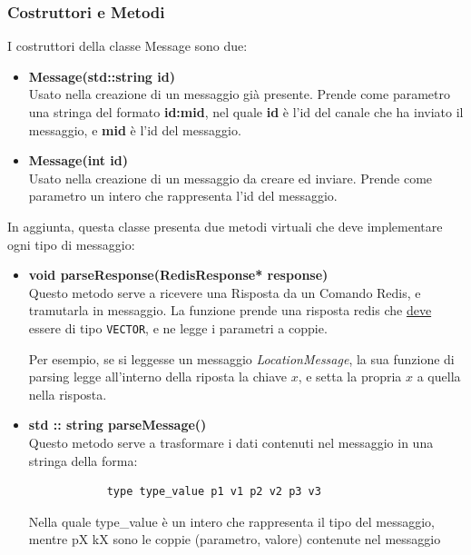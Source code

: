 \documentclass[a4paper, 11pt]{article}
\begin{document}
\subsubsection{Costruttori e Metodi}
I costruttori della classe Message sono due:
\begin{itemize}
    
    \item \textbf{Message(std::string id)}\\
        Usato nella creazione di un messaggio già presente.
        Prende come parametro una stringa del formato \textbf{id:mid}, nel quale \textbf{id} è l'id del canale che ha inviato il messaggio, e \textbf{mid} è l'id del messaggio.

    \item \textbf{Message(int id)}\\
        Usato nella creazione di un messaggio da creare ed inviare.
        Prende come parametro un intero che rappresenta l'id del messaggio.

\end{itemize}
In aggiunta, questa classe presenta due metodi virtuali che deve implementare ogni tipo di messaggio:
\begin{itemize}
    \item \textbf{void parseResponse(RedisResponse* response)}\\
        Questo metodo serve a ricevere una Risposta da un Comando Redis, e tramutarla in messaggio. 
        La funzione prende una risposta redis che \underline{deve} essere di tipo \verb|VECTOR|, e ne legge i parametri a coppie. 
        
        Per esempio, se si leggesse un messaggio\textit{ LocationMessage}, la sua funzione di parsing legge all'interno della riposta 
        la chiave $x$, e setta la propria $x$ a quella nella risposta.
    \item\textbf{std :: string parseMessage()}\\
        Questo metodo serve a trasformare i dati contenuti nel messaggio in una stringa della forma:
        \begin{verbatim}
            type type_value p1 v1 p2 v2 p3 v3
        \end{verbatim}
        Nella quale type\_value è un intero che rappresenta il tipo del messaggio, mentre pX kX sono le coppie (parametro, valore) contenute nel messaggio

\end{itemize}
\end{document}
